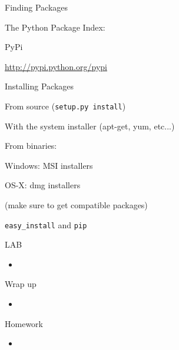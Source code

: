 \documentclass{beamer}
\begin{document}
\begin{frame}[fragile]{Finding Packages}

{\Large The Python Package Index:}

\vfill
{\LARGE PyPi}

\vfill
\url{http://pypi.python.org/pypi}

\end{frame} 

\begin{frame}[fragile]{Installing Packages}

{\Large From source}
(\verb|setup.py install|)

\vfill
{\Large With the system installer (apt-get, yum, etc...)}

\vfill
{\Large From binaries: }

\vfill
{\Large Windows: MSI installers}

\vfill
{\Large OS-X: dmg installers }

(make sure to get compatible packages)

\vfill
{\Large \verb|easy_install| and \verb|pip|}

\end{frame} 



\begin{frame}{LAB}

\begin{itemize}
  \item
\end{itemize}

\end{frame}

\begin{frame}{Wrap up}

\begin{itemize}
  \item
\end{itemize}

\end{frame}



\begin{frame}{Homework}

\begin{itemize}
  \item
\end{itemize}

\end{frame}
\end{document}
